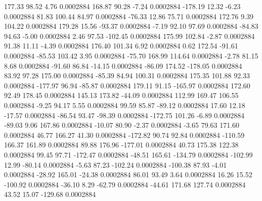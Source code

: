       177.33       98.52        4.76     0.0002884
      168.87       90.28       -7.24     0.0002884
     -178.19       12.32       -6.23     0.0002884
       81.83      100.44       84.97     0.0002884
      -76.33       12.86       75.71     0.0002884
      172.76        9.39      104.22     0.0002884
      179.28       15.56      -93.37     0.0002884
       -7.19       92.10       97.69     0.0002884
      -84.83       94.63       -5.00     0.0002884
        2.46       97.53     -102.45     0.0002884
      175.99      102.84       -2.87     0.0002884
       91.38       11.11       -4.39     0.0002884
      176.40      101.34        6.92     0.0002884
        0.62      172.54      -91.61     0.0002884
      -85.53      103.42        3.95     0.0002884
      -75.70      168.99      114.64     0.0002884
       -2.78       81.15        8.68     0.0002884
      -91.60       86.84      -14.15     0.0002884
      -86.09      174.52     -178.05     0.0002884
       83.92       97.28      175.00     0.0002884
      -85.39       84.94      100.31     0.0002884
      175.35      101.88       92.33     0.0002884
     -177.97       96.94      -85.87     0.0002884
      179.11       91.15     -165.97     0.0002884
      172.60       92.49      178.45     0.0002884
      145.13      173.82      -44.09     0.0002884
      112.99      169.47      106.55     0.0002884
       -9.25       94.17        5.55     0.0002884
       99.59       85.87      -89.12     0.0002884
       17.60       12.18      -17.57     0.0002884
      -86.54       93.47      -98.39     0.0002884
     -172.75      101.26       -6.89     0.0002884
      -89.03        9.06      167.86     0.0002884
      -10.07       80.90       -2.37     0.0002884
       -3.65       79.63      171.60     0.0002884
       46.77      166.27       41.30     0.0002884
     -172.82       90.74       92.84     0.0002884
     -110.59      166.37      161.89     0.0002884
       89.88      176.96     -177.01     0.0002884
       40.73      175.38      122.38     0.0002884
       99.45       97.71     -172.47     0.0002884
      -48.51      165.61     -134.79     0.0002884
     -102.99       12.99      -80.14     0.0002884
       -5.63       87.23     -102.24     0.0002884
     -100.38       87.93       -4.01     0.0002884
      -28.92      165.01      -24.38     0.0002884
       86.01       93.49        3.64     0.0002884
       16.26       15.52     -100.92     0.0002884
      -36.10        8.29      -62.79     0.0002884
      -44.61      171.68      127.74     0.0002884
       43.52       15.07     -129.68     0.0002884
